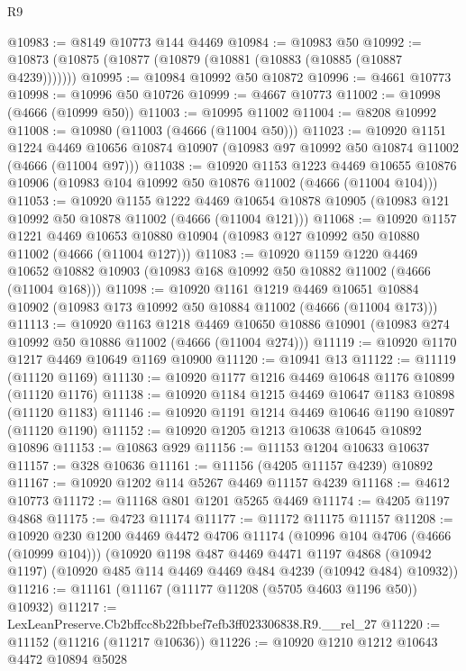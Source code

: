 \begin{lexlean}{R9}
\begin{coremodule}
@10983 := @8149 @10773 @144 @4469
@10984 := @10983 @50
@10992 := @10873 (@10875 (@10877 (@10879 (@10881 (@10883 (@10885 (@10887 @4239)))))))
@10995 := @10984 @10992 @50 @10872
@10996 := @4661 @10773
@10998 := @10996 @50 @10726
@10999 := @4667 @10773
@11002 := @10998 (@4666 (@10999 @50))
@11003 := @10995 @11002
@11004 := @8208 @10992
@11008 := @10980 (@11003 (@4666 (@11004 @50)))
@11023 := @10920
    @1151
    @1224
    @4469
    @10656
    @10874
    @10907
    (@10983 @97 @10992 @50 @10874 @11002 (@4666 (@11004 @97)))
@11038 := @10920
    @1153
    @1223
    @4469
    @10655
    @10876
    @10906
    (@10983 @104 @10992 @50 @10876 @11002 (@4666 (@11004 @104)))
@11053 := @10920
    @1155
    @1222
    @4469
    @10654
    @10878
    @10905
    (@10983 @121 @10992 @50 @10878 @11002 (@4666 (@11004 @121)))
@11068 := @10920
    @1157
    @1221
    @4469
    @10653
    @10880
    @10904
    (@10983 @127 @10992 @50 @10880 @11002 (@4666 (@11004 @127)))
@11083 := @10920
    @1159
    @1220
    @4469
    @10652
    @10882
    @10903
    (@10983 @168 @10992 @50 @10882 @11002 (@4666 (@11004 @168)))
@11098 := @10920
    @1161
    @1219
    @4469
    @10651
    @10884
    @10902
    (@10983 @173 @10992 @50 @10884 @11002 (@4666 (@11004 @173)))
@11113 := @10920
    @1163
    @1218
    @4469
    @10650
    @10886
    @10901
    (@10983 @274 @10992 @50 @10886 @11002 (@4666 (@11004 @274)))
@11119 := @10920 @1170 @1217 @4469 @10649 @1169 @10900
@11120 := @10941 @13
@11122 := @11119 (@11120 @1169)
@11130 := @10920 @1177 @1216 @4469 @10648 @1176 @10899 (@11120 @1176)
@11138 := @10920 @1184 @1215 @4469 @10647 @1183 @10898 (@11120 @1183)
@11146 := @10920 @1191 @1214 @4469 @10646 @1190 @10897 (@11120 @1190)
@11152 := @10920 @1205 @1213 @10638 @10645 @10892 @10896
@11153 := @10863 @929
@11156 := @11153 @1204 @10633 @10637
@11157 := @328 @10636
@11161 := @11156 (@4205 @11157 @4239) @10892
@11167 := @10920 @1202 @114 @5267 @4469 @11157 @4239
@11168 := @4612 @10773
@11172 := @11168 @801 @1201 @5265 @4469
@11174 := @4205 @1197 @4868
@11175 := @4723 @11174
@11177 := @11172 @11175 @11157
@11208 := @10920
    @230
    @1200
    @4469
    @4472
    @4706
    @11174
    (@10996 @104 @4706 (@4666 (@10999 @104)))
    (@10920
      @1198
      @487
      @4469
      @4471
      @1197
      @4868
      (@10942 @1197)
      (@10920 @485 @114 @4469 @4469 @484 @4239 (@10942 @484) @10932))
@11216 := @11161 (@11167 (@11177 @11208 (@5705 @4603 @1196 @50)) @10932)
@11217 := LexLeanPreserve.Cb2bffcc8b22fbbef7efb3ff023306838.R9.__rel_27
@11220 := @11152 (@11216 (@11217 @10636))
@11226 := @10920 @1210 @1212 @10643 @4472 @10894 @5028

\end{coremodule}
\end{lexlean}
